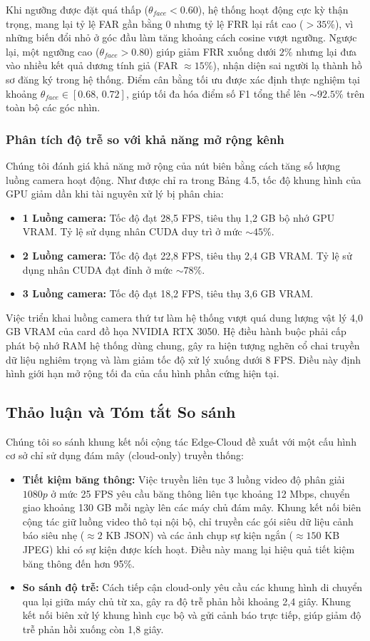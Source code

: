 \documentclass[12pt,a4paper]{article}
\begin{document}
Khi ngưỡng được đặt quá thấp ($\theta_{face} < 0.60$), hệ thống hoạt động cực kỳ thận trọng, mang lại tỷ lệ FAR gần bằng 0 nhưng tỷ lệ FRR lại rất cao ($>35\%$), vì những biến đổi nhỏ ở góc đầu làm tăng khoảng cách cosine vượt ngưỡng. Ngược lại, một ngưỡng cao ($\theta_{face} > 0.80$) giúp giảm FRR xuống dưới $2\%$ nhưng lại đưa vào nhiều kết quả dương tính giả (FAR $\approx 15\%$), nhận diện sai người lạ thành hồ sơ đăng ký trong hệ thống. Điểm cân bằng tối ưu được xác định thực nghiệm tại khoảng $\theta_{face} \in [0.68,\, 0.72]$, giúp tối đa hóa điểm số F1 tổng thể lên $\sim 92.5\%$ trên toàn bộ các góc nhìn.

\subsubsection{Phân tích độ trễ so với khả năng mở rộng kênh}
Chúng tôi đánh giá khả năng mở rộng của nút biên bằng cách tăng số lượng luồng camera hoạt động. Như được chỉ ra trong Bảng 4.5, tốc độ khung hình của GPU giảm dần khi tài nguyên xử lý bị phân chia:
\begin{itemize}
    \item \textbf{1 Luồng camera:} Tốc độ đạt 28,5 FPS, tiêu thụ 1,2 GB bộ nhớ GPU VRAM. Tỷ lệ sử dụng nhân CUDA duy trì ở mức $\sim 45\%$.
    \item \textbf{2 Luồng camera:} Tốc độ đạt 22,8 FPS, tiêu thụ 2,4 GB VRAM. Tỷ lệ sử dụng nhân CUDA đạt đỉnh ở mức $\sim 78\%$.
    \item \textbf{3 Luồng camera:} Tốc độ đạt 18,2 FPS, tiêu thụ 3,6 GB VRAM.
\end{itemize}
Việc triển khai luồng camera thứ tư làm hệ thống vượt quá dung lượng vật lý 4,0 GB VRAM của card đồ họa NVIDIA RTX 3050. Hệ điều hành buộc phải cấp phát bộ nhớ RAM hệ thống dùng chung, gây ra hiện tượng nghẽn cổ chai truyền dữ liệu nghiêm trọng và làm giảm tốc độ xử lý xuống dưới 8 FPS. Điều này định hình giới hạn mở rộng tối đa của cấu hình phần cứng hiện tại.

\subsection{Thảo luận và Tóm tắt So sánh}
Chúng tôi so sánh khung kết nối cộng tác Edge-Cloud đề xuất với một cấu hình cơ sở chỉ sử dụng đám mây (cloud-only) truyền thống:
\begin{itemize}
    \item \textbf{Tiết kiệm băng thông:} Việc truyền liên tục 3 luồng video độ phân giải $1080p$ ở mức 25 FPS yêu cầu băng thông liên tục khoảng 12 Mbps, chuyển giao khoảng 130 GB mỗi ngày lên các máy chủ đám mây. Khung kết nối biên cộng tác giữ luồng video thô tại nội bộ, chỉ truyền các gói siêu dữ liệu cảnh báo siêu nhẹ ($\approx 2$ KB JSON) và các ảnh chụp sự kiện ngắn ($\approx 150$ KB JPEG) khi có sự kiện được kích hoạt. Điều này mang lại hiệu quả tiết kiệm băng thông đến hơn 95\%.
    \item \textbf{So sánh độ trễ:} Cách tiếp cận cloud-only yêu cầu các khung hình di chuyển qua lại giữa máy chủ từ xa, gây ra độ trễ phản hồi khoảng 2,4 giây. Khung kết nối biên xử lý khung hình cục bộ và gửi cảnh báo trực tiếp, giúp giảm độ trễ phản hồi xuống còn 1,8 giây.
\end{itemize}
\end{document}
